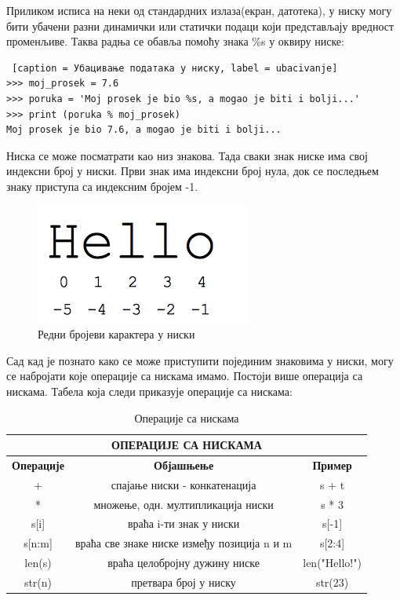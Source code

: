 Приликом исписа на неки од стандардних излаза(екран, датотека), у ниску могу бити убачени разни динамички или статички подаци који представљају вредност променљиве. Таква радња се обавља помоћу знака \%s у оквиру ниске:

\begin{lstlisting} [caption = Убацивање података у ниску, label = ubacivanje]
>>> moj_prosek = 7.6
>>> poruka = 'Moj prosek je bio %s, a mogao je biti i bolji...'
>>> print (poruka % moj_prosek)
Moj prosek je bio 7.6, a mogao je biti i bolji...
\end{lstlisting}

Ниска се може посматрати као низ знакова. Тада сваки знак ниске има свој индексни број у ниски. Први знак има индексни број нула, док се последњем знаку приступа са индексним бројем -1.

\begin{figure}[hеre]
\centering
\includegraphics{hello_string.png}
\caption{Редни бројеви карактера у ниски}
\label{slike:hello}
\end{figure}


Сад кад је познато како се може приступити појединим знаковима у ниски, могу се набројати које операције са нискама имамо. Постоји више операција са нискама. Табела која следи приказује операције са нискама:

\begin{table}[h]
\centering
\begin{tabular}{|c|c|c|} \hline
\multicolumn{3}{|c|}{\textbf{ОПЕРАЦИЈЕ СА НИСКАМА}}\\ \hline
\textbf{Операције} & \textbf{Објашњење} & \textbf{Пример} \\ \hline
                 + & спајање ниски - конкатенација & s + t \\ \hline
                 * & множење, одн. мултипликација ниски & s * 3 \\ \hline
              s[i] & враћа i-ти знак у ниски & s[-1] \\ \hline
            s[n:m] & враћа све знаке ниске између позиција n и m & s[2:4] \\ \hline
            len(s) & враћа целобројну дужину ниске & len("Hello!") \\ \hline
            str(n) & претвара број у ниску & str(23) \\ \hline
\end{tabular}\medskip
\caption{Операције са нискама}
\label{tabele:strings}
\end{table}


